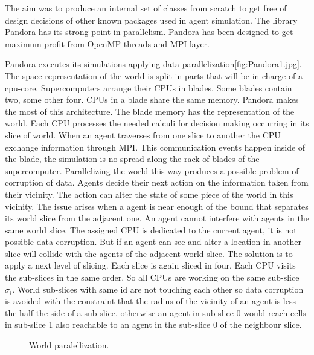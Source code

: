 \documentclass[11pt,oneside,a4paper,openright]{report}
\begin{document}
The aim was to produce an internal set of classes from scratch to get free of design decisions of other known packages used in agent simulation. The library Pandora has its strong point in parallelism. Pandora has been designed to get maximum profit from OpenMP threads and MPI layer. 

Pandora executes its simulations applying data parallelization\ref{fig:Pandora1.jpg}. The space representation of the world is split in parts that will be in charge of a cpu-core. Supercomputers arrange their CPUs in blades. Some blades
contain two, some other four. CPUs in a blade share the same memory. Pandora makes the most of this architecture.
The blade memory has the representation of the world. Each CPU processes the needed calculi for decision
making occurring in its slice of world. When an agent traverses from one slice to another the CPU exchange
information through MPI. This communication events happen inside of the blade, the simulation is no spread
along the rack of blades of the supercomputer.
Parallelizing the world this way produces a possible problem of corruption of data. Agents decide their next action
on the information taken from their vicinity. The action can alter the state of some piece of the world in this
vicinity. The issue arises when a agent is near enough of the bound that separates its world slice from the 
adjacent one. An agent cannot interfere with agents in the same world slice. The assigned CPU is dedicated to
the current agent, it is not possible data corruption. But if an agent can see and alter a location in another
slice will collide with the agents of the adjacent world slice. The solution is to apply a next level of slicing.
Each slice is again sliced in four. Each CPU visits the sub-slices in the same order. So all CPUs are working 
on the same sub-slice $\sigma_i$. World sub-slices with same id are not touching each other so data corruption
is avoided with the constraint that the radius of the vicinity of an agent is less the half the side of a sub-slice,
otherwise an agent in sub-slice 0 would reach cells in sub-slice 1 also reachable to an agent in the sub-slice 0
of the neighbour slice. 


\begin{figure}[h!]
\centering
\setlength\fboxsep{0pt}
\setlength\fboxrule{0.5pt}
\caption{ World paralellization.}
\label{fig:Pandora1}
\end{figure}
\end{document}
